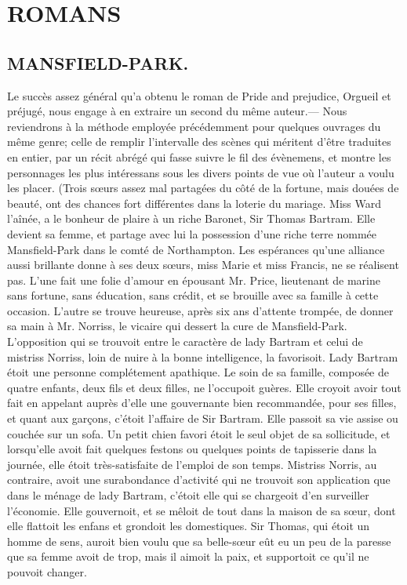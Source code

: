 \setcounter{page}{490}
\chapter{ROMANS}
\section{MANSFIELD-PARK.}
Le succès assez général qu'a obtenu le roman de Pride and prejudice, Orgueil et préjugé, nous engage à en extraire un second du même auteur.— Nous reviendrons à la méthode employée précédemment pour quelques ouvrages du même genre; celle de remplir l'intervalle des scènes qui méritent d'être traduites en entier, par un récit abrégé qui fasse suivre le fil des évènemens, et montre les personnages les plus intéressans sous les divers points de vue où l'auteur a voulu les placer.\setcounter{page}{491} (Trois sœurs assez mal partagées du côté de la fortune, mais douées de beauté, ont des chances fort différentes dans la loterie du mariage. Miss Ward l’aînée, a le bonheur de plaire à un riche Baronet, Sir Thomas Bartram. Elle devient sa femme, et partage avec lui la possession d’une riche terre nommée Mansfield-Park dans le comté de Northampton. Les espérances qu’une alliance aussi brillante donne à ses deux sœurs, miss Marie et miss Francis, ne se réalisent pas. L’une fait une folie d’amour en épousant Mr. Price, lieutenant de marine sans fortune, sans éducation, sans crédit, et se brouille avec sa famille à cette occasion. L’autre se trouve heureuse, après six ans d’attente trompée, de donner sa main à Mr. Norriss, le vicaire qui dessert la cure de Mansfield-Park.
L’opposition qui se trouvoit entre le caractère de lady Bartram et celui de mistriss Norriss, loin de nuire à la bonne intelligence, la favorisoit. Lady Bartram étoit une personne complétement apathique. Le soin de sa famille, composée de quatre enfants, deux fils et deux filles, ne l’occupoit guères. Elle croyoit avoir tout fait en appelant auprès d’elle une gouvernante bien recommandée, pour ses filles, et quant aux garçons, c’étoit l’affaire de Sir Bartram. Elle passoit\setcounter{page}{492} sa vie assise ou couchée sur un sofa. Un petit chien favori étoit le seul objet de sa sollicitude, et lorsqu'elle avoit fait quelques festons ou quelques points de tapisserie dans la journée, elle étoit très-satisfaite de l'emploi de son temps. Mistriss Norris, au contraire, avoit une surabondance d'activité qui ne trouvoit son application que dans le ménage de lady Bartram, c'étoit elle qui se chargeoit d'en surveiller l'économie. Elle gouvernoit, et se mêloit de tout dans la maison de sa sœur, dont elle flattoit les enfans et grondoit les domestiques. Sir Thomas, qui étoit un homme de sens, auroit bien voulu que sa belle-sœur eût eu un peu de la paresse que sa femme avoit de trop, mais il aimoit la paix, et supportoit ce qu'il ne pouvoit changer.
